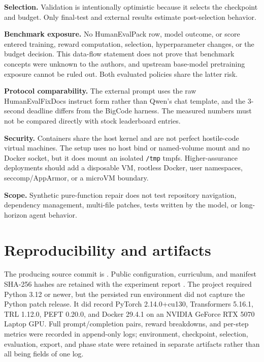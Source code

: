 \documentclass[11pt]{article}
\begin{document}
\textbf{Selection.} Validation is intentionally optimistic because it selects the checkpoint and budget. Only final-test and external results estimate post-selection behavior.

\textbf{Benchmark exposure.} No HumanEvalPack row, model outcome, or score entered training, reward computation, selection, hyperparameter changes, or the budget decision. This data-flow statement does not prove that benchmark concepts were unknown to the authors, and upstream base-model pretraining exposure cannot be ruled out. Both evaluated policies share the latter risk.

\textbf{Protocol comparability.} The external prompt uses the raw HumanEvalFixDocs instruct form rather than Qwen's chat template, and the 3-second deadline differs from the BigCode harness. The measured numbers must not be compared directly with stock leaderboard entries.

\textbf{Security.} Containers share the host kernel and are not perfect hostile-code virtual machines. The setup uses no host bind or named-volume mount and no Docker socket, but it does mount an isolated \texttt{/tmp} tmpfs. Higher-assurance deployments should add a disposable VM, rootless Docker, user namespaces, seccomp/AppArmor, or a microVM boundary.

\textbf{Scope.} Synthetic pure-function repair does not test repository navigation, dependency management, multi-file patches, tests written by the model, or long-horizon agent behavior.

\section{Reproducibility and artifacts}

The producing source commit is \texttt{\SourceCommit}. Public configuration, curriculum, and manifest SHA-256 hashes are retained with the experiment report \cite{sourcecommit,runsummary}. The project required Python 3.12 or newer, but the persisted run environment did not capture the Python patch release. It did record PyTorch 2.14.0+cu130, Transformers 5.16.1, TRL 1.12.0, PEFT 0.20.0, and Docker 29.4.1 on an NVIDIA GeForce RTX 5070 Laptop GPU. Full prompt/completion pairs, reward breakdowns, and per-step metrics were recorded in append-only logs; environment, checkpoint, selection, evaluation, export, and phase state were retained in separate artifacts rather than all being fields of one log.
\end{document}
